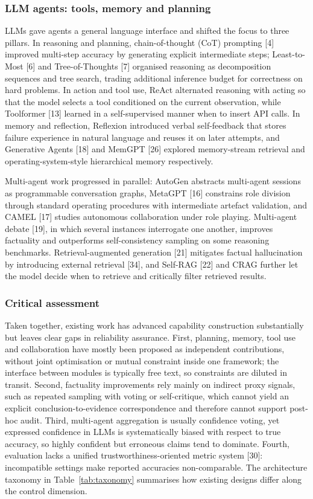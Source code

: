 \documentclass[journal,10pt,a4paper]{IEEEtran}
\begin{document}
\subsubsection{LLM agents: tools, memory and planning}
LLMs gave agents a general language interface and shifted the focus to three pillars. In reasoning and planning, chain-of-thought (CoT) prompting [4] improved multi-step accuracy by generating explicit intermediate steps; Least-to-Most [6] and Tree-of-Thoughts [7] organised reasoning as decomposition sequences and tree search, trading additional inference budget for correctness on hard problems. In action and tool use, ReAct alternated reasoning with acting so that the model selects a tool conditioned on the current observation, while Toolformer [13] learned in a self-supervised manner when to insert API calls. In memory and reflection, Reflexion introduced verbal self-feedback that stores failure experience in natural language and reuses it on later attempts, and Generative Agents [18] and MemGPT [26] explored memory-stream retrieval and operating-system-style hierarchical memory respectively.

Multi-agent work progressed in parallel: AutoGen abstracts multi-agent sessions as programmable conversation graphs, MetaGPT [16] constrains role division through standard operating procedures with intermediate artefact validation, and CAMEL [17] studies autonomous collaboration under role playing. Multi-agent debate [19], in which several instances interrogate one another, improves factuality and outperforms self-consistency sampling on some reasoning benchmarks. Retrieval-augmented generation [21] mitigates factual hallucination by introducing external retrieval [34], and Self-RAG [22] and CRAG further let the model decide when to retrieve and critically filter retrieved results.

\subsubsection{Critical assessment}
Taken together, existing work has advanced capability construction substantially but leaves clear gaps in reliability assurance. First, planning, memory, tool use and collaboration have mostly been proposed as independent contributions, without joint optimisation or mutual constraint inside one framework; the interface between modules is typically free text, so constraints are diluted in transit. Second, factuality improvements rely mainly on indirect proxy signals, such as repeated sampling with voting or self-critique, which cannot yield an explicit conclusion-to-evidence correspondence and therefore cannot support post-hoc audit. Third, multi-agent aggregation is usually confidence voting, yet expressed confidence in LLMs is systematically biased with respect to true accuracy, so highly confident but erroneous claims tend to dominate. Fourth, evaluation lacks a unified trustworthiness-oriented metric system [30]: incompatible settings make reported accuracies non-comparable. The architecture taxonomy in Table~\ref{tab:taxonomy} summarises how existing designs differ along the control dimension.
\end{document}

